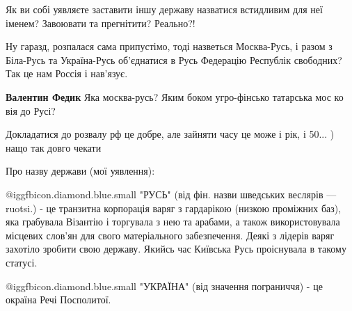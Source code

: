 \begin{itemize}
 

Як ви собі уявляєте заставити іншу державу назватися встидливим для неї іменем?
Завоювати та прегнітити? Реально?!

Ну гаразд, розпалася сама припустімо, тоді назветься Москва-Русь, і разом з
Біла-Русь та Україна-Русь об'єднатися в Русь Федерацію Республік свободних? Так
це нам Россія і нав'язує.

\begin{itemize}
 
\textbf{Валентин Федик} Яка москва-русь? Яким боком угро-фінсько татарська мос ко вія до Русі?
\end{itemize}

 
Докладатися до розвалу рф це добре, але зайняти часу це може і рік, і 50... ) нащо так довго чекати

 
Про назву держави (мої уявлення):

 @igg{fbicon.diamond.blue.small} "РУСЬ" (від фін. назви шведських веслярів — ruotsi.) - це транзитна
корпорація варяг з гардарікою (низкою проміжних баз), яка грабувала Візантію і
торгувала з нею та арабами, а також використовувала місцевих слов'ян для свого
матеріального забезпечення. Деякі з лідерів варяг захотіло зробити свою
державу. Якийсь час Київська Русь проіснувала в такому статусі.

 @igg{fbicon.diamond.blue.small} "УКРАЇНА" (від значення пограниччя) - це окраїна Речі Посполитої.


\end{itemize}
